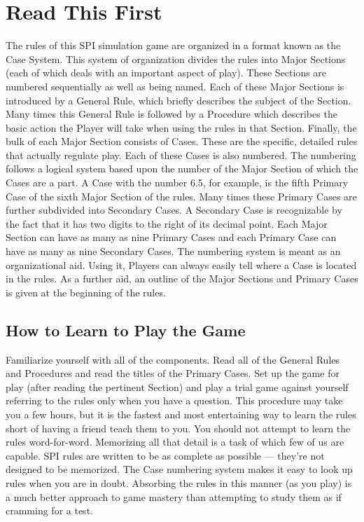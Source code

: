 \section*{Read This First}

The rules of this SPI simulation game are organized in a format known as the Case System. This system of organization divides the rules into Major Sections (each of which deals with an important aspect of play). These Sections are numbered sequentially as well as being named. Each of these Major Sections is introduced by a General Rule, which briefly describes the subject of the Section. Many times this General Rule is followed by a Procedure which describes the basic action the Player will take when using the rules in that Section. Finally, the bulk of each Major Section consists of Cases. These are the specific, detailed rules that actually regulate play. Each of these Cases is also numbered. The numbering follows a logical system based upon the number of the Major Section of which the Cases are a part. A Case with the number 6.5, for example, is the fifth Primary Case of the sixth Major Section of the rules. Many times these Primary Cases are further subdivided into Secondary Cases. A Secondary Case is recognizable by the fact that it has two digits to the right of its decimal point. Each Major Section can have as many as nine Primary Cases and each Primary Case can have as many as nine Secondary Cases. The numbering system is meant as an organizational aid. Using it, Players can always easily tell where a Case is located in the rules. As a further aid, an outline of the Major Sections and Primary Cases is given at the beginning of the rules.

\subsection*{How to Learn to Play the Game}
Familiarize yourself with all of the components. Read all of the General Rules and Procedures and read the titles of the Primary Cases. Set up the game for play (after reading the pertinent Section) and play a trial game against yourself referring to the rules only when you have a question. This procedure may take you a few hours, but it is the fastest and most entertaining way to learn the rules short of having a friend teach them to you. You should not attempt to learn the rules word-for-word. Memorizing all that detail is a task of which few of us are capable. SPI rules are written to be as complete as possible — they’re not designed to be memorized. The Case numbering system makes it easy to look up rules when you are in doubt. Absorbing the rules in this manner (as you play) is a much better approach to game mastery than attempting to study them as if cramming for a test.
